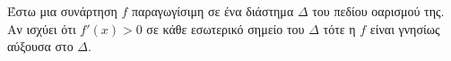 Έστω μια συνάρτηση $ f $ παραγωγίσιμη σε ένα διάστημα $ \Delta $ του πεδίου οαρισμού της. Αν ισχύει ότι $ f'(x)>0 $ σε κάθε εσωτερικό σημείο του $ \Delta $ τότε η $ f $ είναι γνησίως αύξουσα στο $ \Delta $.
